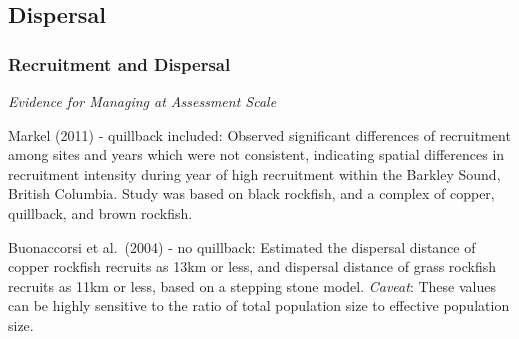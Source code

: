 \documentclass[11pt,
  english,
  letterpaper,
]{article}
\begin{document}
\leavevmode\tagmcend\tagstructend


\hypertarget{dispersal}{%
\subsection{Dispersal}\label{dispersal}}

\leavevmode\tagmcend\tagstructend


\hypertarget{recruitment-and-dispersal}{%
\subsubsection{Recruitment and Dispersal}\label{recruitment-and-dispersal}}

\leavevmode\tagmcend\tagstructend


\emph{Evidence for Managing at Assessment Scale}

\leavevmode\tagmcend\tagstructend\par


Markel {(2011)\leavevmode\tagmcend\tagstructend} - quillback included: Observed significant differences of recruitment among sites and years which were not consistent, indicating spatial differences in recruitment intensity during year of high recruitment within the Barkley Sound, British Columbia. Study was based on black rockfish, and a complex of copper, quillback, and brown rockfish.

\leavevmode\tagmcend\tagstructend\par


Buonaccorsi et al.~{(2004)\leavevmode\tagmcend\tagstructend} - no quillback: Estimated the dispersal distance of copper rockfish recruits as 13km or less, and dispersal distance of grass rockfish recruits as 11km or less, based on a stepping stone model. \emph{Caveat}: These values can be highly sensitive to the ratio of total population size to effective population size.

\leavevmode\tagmcend\tagstructend\par
\end{document}

